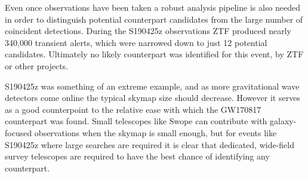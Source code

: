 \begin{colsection}
\begin{colsection}
Even once observations have been taken a robust analysis pipeline is also needed in order to distinguish potential counterpart candidates from the large number of coincident detections. During the S190425z observations ZTF produced nearly 340,000 transient alerts, which were narrowed down to just 12 potential candidates. Ultimately no likely counterpart was identified for this event, by ZTF or other projects.

S190425z was something of an extreme example, and as more gravitational wave detectors come online the typical skymap size should decrease. However it serves as a good counterpoint to the relative ease with which the GW170817 counterpart was found. Small telescopes like Swope can contribute with galaxy-focused observations when the skymap is small enough, but for events like S190425z where large searches are required it is clear that dedicated, wide-field survey telescopes are required to have the best chance of identifying any counterpart.

\end{colsection}


\end{colsection}


\newpage
